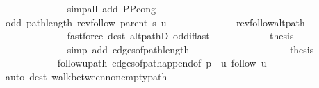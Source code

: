 \begin{isabellebody}
\ \ \ \ \ \ \ \ \ \ \ \ \isamarkupfalse%
\ {\isacharparenleft}{\kern0pt}simp{\isacharunderscore}{\kern0pt}all\ add{\isacharcolon}{\kern0pt}\ P{\isacharprime}{\kern0pt}{\isacharunderscore}{\kern0pt}P{\isacharprime}{\kern0pt}{\isacharprime}{\kern0pt}{\isacharunderscore}{\kern0pt}cong{\isacharparenright}{\kern0pt}\isanewline
\ \ \ \ \ \ \ \ \ \ \isamarkupfalse%
\ {\isachardoublequoteopen}odd\ {\isacharparenleft}{\kern0pt}path{\isacharunderscore}{\kern0pt}length\ {\isacharparenleft}{\kern0pt}rev{\isacharunderscore}{\kern0pt}follow\ {\isacharparenleft}{\kern0pt}parent\ s{\isacharparenright}{\kern0pt}\ u{\isacharparenright}{\kern0pt}{\isacharparenright}{\kern0pt}{\isachardoublequoteclose}\isanewline
\ \ \ \ \ \ \ \ \ \ \ \ \isamarkupfalse%
\ rev{\isacharunderscore}{\kern0pt}follow{\isacharunderscore}{\kern0pt}alt{\isacharunderscore}{\kern0pt}path\isanewline
\ \ \ \ \ \ \ \ \ \ \ \ \isamarkupfalse%
\ {\isacharparenleft}{\kern0pt}fastforce\ dest{\isacharcolon}{\kern0pt}\ alt{\isacharunderscore}{\kern0pt}pathD{\isacharparenleft}{\kern0pt}{}{\isacharparenright}{\kern0pt}\ odd{\isacharunderscore}{\kern0pt}if{\isacharunderscore}{\kern0pt}last{\isacharparenright}{\kern0pt}\isanewline
\ \ \ \ \ \ \ \ \ \ \isamarkupfalse%
\ {\isacharquery}{\kern0pt}thesis\isanewline
\ \ \ \ \ \ \ \ \ \ \ \ \isamarkupfalse%
\ {\isacharparenleft}{\kern0pt}simp\ add{\isacharcolon}{\kern0pt}\ edges{\isacharunderscore}{\kern0pt}of{\isacharunderscore}{\kern0pt}path{\isacharunderscore}{\kern0pt}length{\isacharparenright}{\kern0pt}\isanewline
\ \ \ \ \ \ \ \ \isamarkupfalse%
\isanewline
\ \ \ \ \ \ \ \ \isamarkupfalse%
\ \isamarkupfalse%
\ {\isacharquery}{\kern0pt}thesis\isanewline
\ \ \ \ \ \ \ \ \ \ \isamarkupfalse%
\ follow{\isacharunderscore}{\kern0pt}u{\isacharunderscore}{\kern0pt}path\ edges{\isacharunderscore}{\kern0pt}of{\isacharunderscore}{\kern0pt}path{\isacharunderscore}{\kern0pt}append{\isacharunderscore}{\kern0pt}{}{\isacharbrackleft}{\kern0pt}of\ {\isachardoublequoteopen}p\ {\isacharat}{\kern0pt}\ {\isacharbrackleft}{\kern0pt}u{\isacharbrackright}{\kern0pt}{\isachardoublequoteclose}\ {\isachardoublequoteopen}follow\ u{\isachardoublequoteclose}{\isacharbrackright}{\kern0pt}\isanewline
\ \ \ \ \ \ \ \ \ \ \isamarkupfalse%
\ {\isacharparenleft}{\kern0pt}auto\ dest{\isacharcolon}{\kern0pt}\ walk{\isacharunderscore}{\kern0pt}between{\isacharunderscore}{\kern0pt}nonempty{\isacharunderscore}{\kern0pt}path{\isacharparenleft}{\kern0pt}{}{\isacharparenright}{\kern0pt}{\isacharparenright}{\kern0pt}\isanewline

\end{isabellebody}
